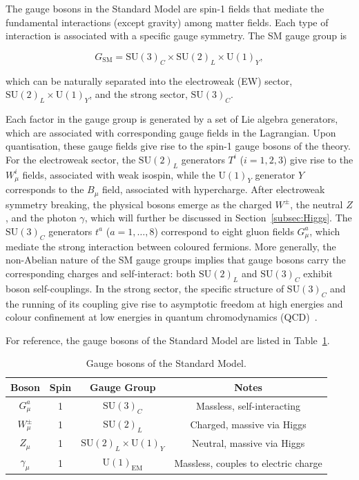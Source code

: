 The gauge bosons in the Standard Model are spin-1 fields that mediate the fundamental interactions (except gravity) among matter fields. 
Each type of interaction is associated with a specific gauge symmetry. 
The SM gauge group is 

\begin{equation}
    G_{\mathrm{SM}} = \mathrm{SU}(3)_C \times \mathrm{SU}(2)_L \times \mathrm{U}(1)_Y,
\end{equation}

which can be naturally separated into the electroweak (EW) sector, $\mathrm{SU}(2)_L \times \mathrm{U}(1)_Y$, and the strong sector, $\mathrm{SU}(3)_C$.

Each factor in the gauge group is generated by a set of Lie algebra generators, which are associated with corresponding gauge fields in the Lagrangian.
Upon quantisation, these gauge fields give rise to the spin-1 gauge bosons of the theory.
For the electroweak sector, the $\mathrm{SU}(2)_L$ generators $T^i$ ($i=1,2,3$) give rise to the $W_\mu^i$ fields, associated with weak isospin, while the $\mathrm{U}(1)_Y$ generator $Y$ corresponds to the $B_\mu$ field, associated with hypercharge. 
After electroweak symmetry breaking, the physical bosons emerge as the charged $W^\pm$, the neutral $Z$, and the photon $\gamma$, which will further be discussed in Section~\ref{subsec:Higgs}.
The $\mathrm{SU}(3)_C$ generators $t^a$ ($a=1,\dots,8$) correspond to eight gluon fields $G_\mu^a$, which mediate the strong interaction between coloured fermions. 
More generally, the non-Abelian nature of the SM gauge groups implies that gauge bosons carry the corresponding charges and self-interact: both $\mathrm{SU}(2)_L$ and $\mathrm{SU}(3)_C$ exhibit boson self-couplings.
In the strong sector, the specific structure of $\mathrm{SU}(3)_C$ and the running of its coupling give rise to asymptotic freedom at high energies and colour confinement at low energies in quantum chromodynamics (QCD)~\cite{GrossWilczek1973AsymptoticFreedom,Politzer1973ReliablePerturbativeResults}.

For reference, the gauge bosons of the Standard Model are listed in Table~\ref{tab:gauge-bosons}.

\begin{table}[h!]
\centering
\begin{tabular}{c c c c}
\hline
Boson & Spin & Gauge Group & Notes \\
\hline
$G_\mu^a$ & 1 & $\mathrm{SU}(3)_C$ & Massless, self-interacting \\
$W^\pm_\mu$ & 1 & $\mathrm{SU}(2)_L$ & Charged, massive via Higgs \\
$Z_\mu$ & 1 & $\mathrm{SU}(2)_L \times \mathrm{U}(1)_Y$ & Neutral, massive via Higgs \\
$\gamma_\mu$ & 1 & $\mathrm{U}(1)_\mathrm{EM}$ & Massless, couples to electric charge \\
\hline
\end{tabular}
\caption{Gauge bosons of the Standard Model.}
\label{tab:gauge-bosons}
\end{table}

